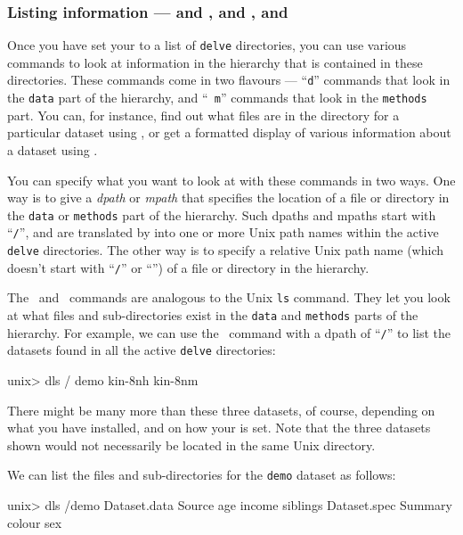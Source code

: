 \subsubsection*{Listing information 
    --- \dls{} and \mls{}, \dinfo{} and \minfo{}, \dmore{} and \mmore{}}

Once you have set your \delvepath{} to a list of \texttt{delve}
directories, you can use various \delve{} commands to look at
information in the \delve{} hierarchy that is contained in these
directories.  These commands come in two flavours --- ``\texttt{d}''
commands that look in the \texttt{data} part of the hierarchy, and ``{\tt
m}'' commands that look in the \texttt{methods} part.  You can, for
instance, find out what files are in the directory for a particular
dataset using \dls{}, or get a formatted display of various information
about a dataset using \dinfo{}.

You can specify what you want to look at with these commands in two
ways.  One way is to give a \emph{dpath} or \emph{mpath} that
specifies the location of a file or directory in the \texttt{data} or
\texttt{methods} part of the hierarchy.  Such dpaths and mpaths start
with ``\texttt{/}'', and are translated by \delve{} into one or more
Unix path names within the active \texttt{delve} directories.  The
other way is to specify a relative Unix path name (which doesn't start
with ``\texttt{/}'' or ``\texttt{\maketilde{}}'') of a file or directory
in the \delve{} hierarchy.

The \dls\ and \mls\ commands are analogous to the Unix \texttt{ls}
command.  They let you look at what files and sub-directories exist in
the \texttt{data} and \texttt{methods} parts of the \delve{} hierarchy.  For
example, we can use the \dls\ command with a dpath of ``\texttt{/}'' to
list the datasets found in all the active \texttt{delve} directories:

\begin{Session}
unix> dls /
demo kin-8nh kin-8nm
\end{Session}

There might be many more than these three datasets, of course,
depending on what you have installed, and on how your \delvepath{} is
set.  Note that the three datasets shown would not necessarily be
located in the same Unix directory.  

We can list the files and sub-directories for the \texttt{demo} dataset
as follows:

\begin{Session}
unix> dls /demo
Dataset.data Source       age          income       siblings                  
Dataset.spec Summary      colour       sex
\end{Session}

